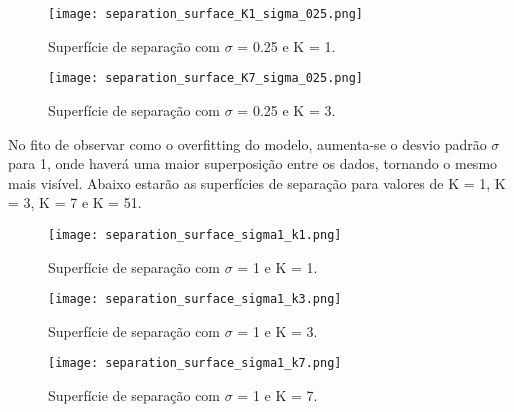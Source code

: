 \documentclass{article} %
\begin{document}
\begin{figure}[h] %
    \centering %
    \texttt{[image: separation\_surface\_K1\_sigma\_025.png]} %
    \caption{Superfície de separação com $\sigma$ = 0.25 e K = 1.} %
    \label{fig:exemplo} %
\end{figure}

\begin{figure}[h] %
    \centering %
    \texttt{[image: separation\_surface\_K7\_sigma\_025.png]} %
    \caption{Superfície de separação com $\sigma$ = 0.25 e K = 3.} %
    \label{fig:exemplo} %
\end{figure}

\newpage

No fito de observar como o overfitting do modelo, aumenta-se o desvio padrão $\sigma$ para 1, onde haverá uma maior superposição entre os dados, tornando o mesmo mais visível. Abaixo estarão as superfícies de separação para valores de K = 1, K = 3, K = 7 e K = 51.

\begin{figure}[h] %
    \centering %
    \texttt{[image: separation\_surface\_sigma1\_k1.png]} %
    \caption{Superfície de separação com $\sigma$ = 1 e K = 1.} %
    \label{fig:exemplo} %
\end{figure}

\begin{figure}[h] %
    \centering %
    \texttt{[image: separation\_surface\_sigma1\_k3.png]} %
    \caption{Superfície de separação com $\sigma$ = 1 e K = 3.} %
    \label{fig:exemplo} %
\end{figure}

\begin{figure}[h] %
    \centering %
    \texttt{[image: separation\_surface\_sigma1\_k7.png]} %
    \caption{Superfície de separação com $\sigma$ = 1 e K = 7.} %
    \label{fig:exemplo} %
\end{figure}
\end{document}
